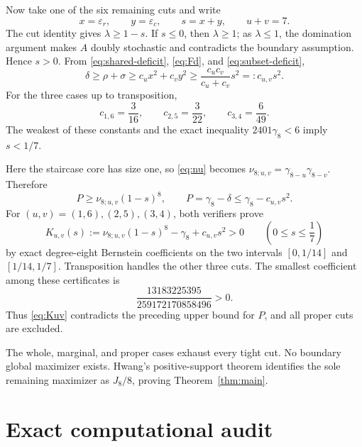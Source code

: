 \documentclass[11pt]{article}
\theoremstyle{remark}
\begin{document}
Now take one of the six remaining cuts and write
\[
 x=\varepsilon_r,\qquad y=\varepsilon_c,
 \qquad s=x+y,\qquad u+v=7.
\]
The cut identity gives $\lambda\ge1-s$.  If $s\le0$, then $\lambda\ge1$;
as $\lambda\le1$, the domination argument makes $A$ doubly stochastic and
contradicts the boundary assumption.  Hence $s>0$.  From
\eqref{eq:shared-deficit}, \eqref{eq:Fd}, and
\eqref{eq:subset-deficit},
\begin{equation}\label{eq:s-deficit}
 \delta\ge\rho+\sigma
 \ge c_ux^2+c_vy^2
 \ge \frac{c_uc_v}{c_u+c_v}s^2=:c_{u,v}s^2.
\end{equation}
For the three cases up to transposition,
\begin{equation}\label{eq:ceff}
 c_{1,6}=\frac3{16},\qquad
 c_{2,5}=\frac3{22},\qquad
 c_{3,4}=\frac6{49}.
\end{equation}
The weakest of these constants and the exact inequality
$2401\gamma_8<6$ imply $s<1/7$.

Here the staircase core has size one, so \eqref{eq:nu} becomes
$\nu_{8;u,v}=\gamma_{8-u}\gamma_{8-v}$.  Therefore
\[
 P\ge\nu_{8;u,v}(1-s)^8,
 \qquad
 P=\gamma_8-\delta\le\gamma_8-c_{u,v}s^2.
\]
For $(u,v)=(1,6),(2,5),(3,4)$, both verifiers prove
\begin{equation}\label{eq:Kuv}
 K_{u,v}(s):=\nu_{8;u,v}(1-s)^8-\gamma_8+c_{u,v}s^2>0
 \qquad\left(0\le s\le\frac17\right)
\end{equation}
by exact degree-eight Bernstein coefficients on the two intervals
$[0,1/14]$ and $[1/14,1/7]$.  Transposition handles the other three cuts.
The smallest coefficient among these certificates is
\[
 \frac{13183225395}{259172170858496}>0.
\]
Thus \eqref{eq:Kuv} contradicts the preceding upper bound for $P$, and all
proper cuts are excluded.

The whole, marginal, and proper cases exhaust every tight cut.  No boundary
global maximizer exists.  Hwang's positive-support theorem identifies the
sole remaining maximizer as $J_8/8$, proving Theorem~\ref{thm:main}.

\section{Exact computational audit}
\end{document}
